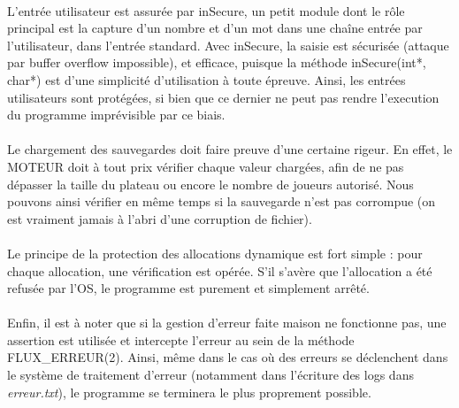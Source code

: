 \documentclass{report}
\begin{document}
        \paragraph*{} %
        L'entrée utilisateur est assurée par inSecure, un petit module dont le rôle principal est la capture d'un nombre et d'un mot dans une chaîne entrée par l'utilisateur, 
            dans l'entrée standard.
        Avec inSecure, la saisie est sécurisée (attaque par buffer overflow impossible), et efficace, puisque la méthode inSecure(int*, char*) est d'une simplicité d'utilisation
            à toute épreuve.
        Ainsi, les entrées utilisateurs sont protégées, si bien que ce dernier ne peut pas rendre l'execution du programme imprévisible par ce biais.

        \paragraph*{} %
        Le chargement des sauvegardes doit faire preuve d'une certaine rigeur. En effet, le MOTEUR doit à tout prix vérifier chaque valeur chargées, afin de ne pas dépasser la taille du plateau ou encore le nombre de joueurs autorisé. Nous pouvons ainsi vérifier en même temps si la sauvegarde n'est pas corrompue (on est vraiment jamais à l'abri d'une corruption de fichier).

        \paragraph*{} %
        Le principe de la protection des allocations dynamique est fort simple : pour chaque allocation, une vérification est opérée. S'il s'avère que l'allocation a été refusée par l'OS,
        le programme est purement et simplement arrêté.

        \paragraph*{} %
        Enfin, il est à noter que si la gestion d'erreur faite maison ne fonctionne pas, une assertion est utilisée et intercepte l'erreur au sein de la méthode FLUX\_ERREUR(2).
        Ainsi, même dans le cas où des erreurs se déclenchent dans le système de traitement d'erreur (notamment dans l'écriture des logs dans \textit{erreur.txt}), 
            le programme se terminera le plus proprement possible.


\end{document}
